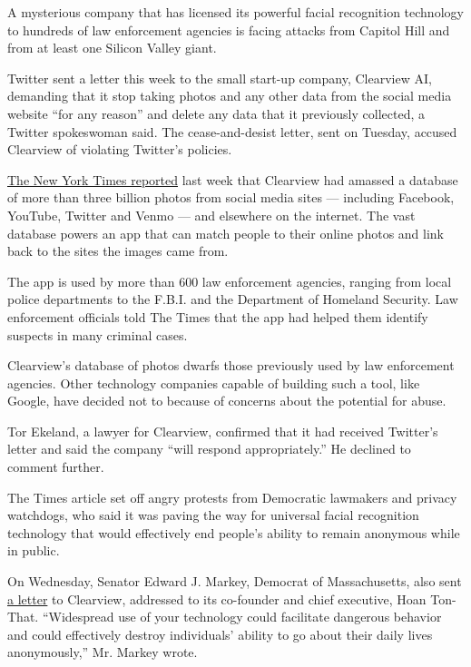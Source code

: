 A mysterious company that has licensed its powerful facial recognition
technology to hundreds of law enforcement agencies is facing attacks
from Capitol Hill and from at least one Silicon Valley giant.

Twitter sent a letter this week to the small start-up company, Clearview
AI, demanding that it stop taking photos and any other data from the
social media website ``for any reason'' and delete any data that it
previously collected, a Twitter spokeswoman said. The cease-and-desist
letter, sent on Tuesday, accused Clearview of violating Twitter's
policies.

\href{https://www.nytimes3xbfgragh.onion/2020/01/18/technology/clearview-privacy-facial-recognition.html}{The
New York Times reported} last week that Clearview had amassed a database
of more than three billion photos from social media sites --- including
Facebook, YouTube, Twitter and Venmo --- and elsewhere on the internet.
The vast database powers an app that can match people to their online
photos and link back to the sites the images came from.

The app is used by more than 600 law enforcement agencies, ranging from
local police departments to the F.B.I. and the Department of Homeland
Security. Law enforcement officials told The Times that the app had
helped them identify suspects in many criminal cases.

Clearview's database of photos dwarfs those previously used by law
enforcement agencies. Other technology companies capable of building
such a tool, like Google, have decided not to because of concerns about
the potential for abuse.

Tor Ekeland, a lawyer for Clearview, confirmed that it had received
Twitter's letter and said the company ``will respond appropriately.'' He
declined to comment further.

The Times article set off angry protests from Democratic lawmakers and
privacy watchdogs, who said it was paving the way for universal facial
recognition technology that would effectively end people's ability to
remain anonymous while in public.

On Wednesday, Senator Edward J. Markey, Democrat of Massachusetts, also
sent
\href{https://int.graylady3jvrrxbe.onion/data/documenthelper/6718-sen-markey-letter-to-clearview/33422997119c3d43033d/optimized/full.pdf\#page=1}{a
letter} to Clearview, addressed to its co-founder and chief executive,
Hoan Ton-That. ``Widespread use of your technology could facilitate
dangerous behavior and could effectively destroy individuals' ability to
go about their daily lives anonymously,'' Mr. Markey wrote.

